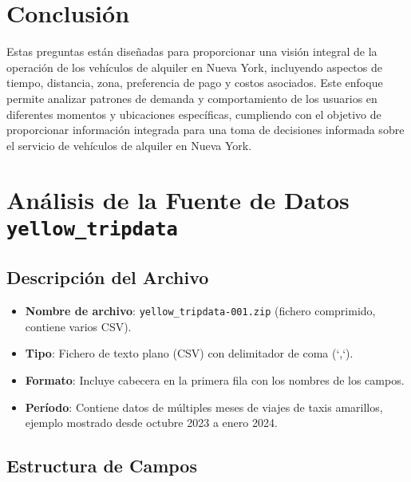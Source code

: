\documentclass{article}
\begin{document}
\section*{Conclusión}

Estas preguntas están diseñadas para proporcionar una visión integral de la operación de los vehículos de alquiler en Nueva York, incluyendo aspectos de tiempo, distancia, zona, preferencia de pago y costos asociados. Este enfoque permite analizar patrones de demanda y comportamiento de los usuarios en diferentes momentos y ubicaciones específicas, cumpliendo con el objetivo de proporcionar información integrada para una toma de decisiones informada sobre el servicio de vehículos de alquiler en Nueva York.



\section*{Análisis de la Fuente de Datos \texttt{yellow\_tripdata}}

\subsection*{Descripción del Archivo}
\begin{itemize}
    \item \textbf{Nombre de archivo}: \texttt{yellow\_tripdata-001.zip} (fichero comprimido, contiene varios CSV).
    \item \textbf{Tipo}: Fichero de texto plano (CSV) con delimitador de coma (`,`).
    \item \textbf{Formato}: Incluye cabecera en la primera fila con los nombres de los campos.
    \item \textbf{Período}: Contiene datos de múltiples meses de viajes de taxis amarillos, ejemplo mostrado desde octubre 2023 a enero 2024.
\end{itemize}

\subsection*{Estructura de Campos}
\end{document}
